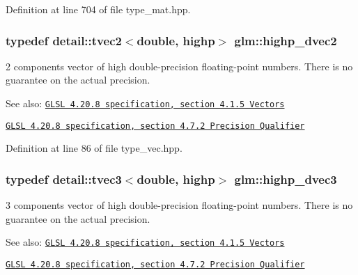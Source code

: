 Definition at line 704 of file type\_\-mat.hpp.\hypertarget{group__core__precision_gcfbe8512142fff27f0bfb44958c1752f}{
\subsubsection[highp\_\-dvec2]{\setlength{\rightskip}{0pt plus 5cm}typedef detail::tvec2$<$double, highp$>$ {\bf glm::highp\_\-dvec2}}}
\label{group__core__precision_gcfbe8512142fff27f0bfb44958c1752f}


2 components vector of high double-precision floating-point numbers. There is no guarantee on the actual precision.

\begin{Desc}
\item[See also:]\href{http://www.opengl.org/registry/doc/GLSLangSpec.4.20.8.pdf}{\tt GLSL 4.20.8 specification, section 4.1.5 Vectors} 

\href{http://www.opengl.org/registry/doc/GLSLangSpec.4.20.8.pdf}{\tt GLSL 4.20.8 specification, section 4.7.2 Precision Qualifier} \end{Desc}


Definition at line 86 of file type\_\-vec.hpp.\hypertarget{group__core__precision_g4962711854156dae8ebb4eb39237c542}{
\subsubsection[highp\_\-dvec3]{\setlength{\rightskip}{0pt plus 5cm}typedef detail::tvec3$<$double, highp$>$ {\bf glm::highp\_\-dvec3}}}
\label{group__core__precision_g4962711854156dae8ebb4eb39237c542}


3 components vector of high double-precision floating-point numbers. There is no guarantee on the actual precision.

\begin{Desc}
\item[See also:]\href{http://www.opengl.org/registry/doc/GLSLangSpec.4.20.8.pdf}{\tt GLSL 4.20.8 specification, section 4.1.5 Vectors} 

\href{http://www.opengl.org/registry/doc/GLSLangSpec.4.20.8.pdf}{\tt GLSL 4.20.8 specification, section 4.7.2 Precision Qualifier} \end{Desc}



